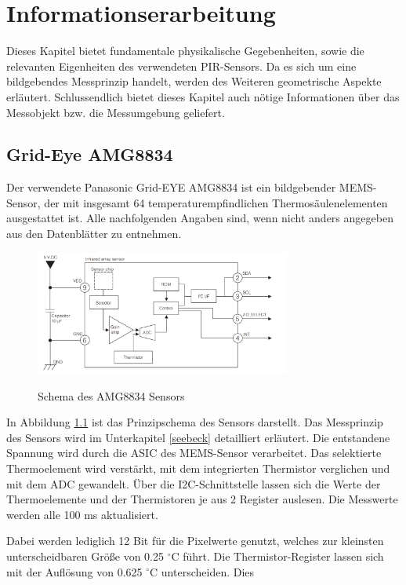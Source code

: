\chapter{Informationserarbeitung}
\label{chap:Informationsbeschaffung}
Dieses Kapitel bietet fundamentale physikalische Gegebenheiten, sowie die relevanten Eigenheiten des verwendeten \ac{PIR}-Sensors. Da es sich um eine bildgebendes Messprinzip handelt, werden des Weiteren geometrische Aspekte erläutert. Schlussendlich bietet dieses Kapitel auch nötige Informationen über das Messobjekt bzw. die Messumgebung geliefert.

\section{Grid-Eye AMG8834}

Der verwendete Panasonic Grid-EYE AMG8834 ist ein bildgebender \ac{MEMS}-Sensor, der mit insgesamt 64 temperaturempfindlichen Thermosäulenelementen ausgestattet ist. Alle nachfolgenden Angaben sind, wenn nicht anders angegeben aus den Datenblätter zu entnehmen.

\begin{figure}[H]
	\centering
	\includegraphics[width=0.75\textwidth]
	{fig/Circuit_AMG8834.PNG}
	\caption[Schema des AMG8834 Sensors]{Schema des AMG8834 Sensors} \protect\cite{AMG8834}
	\label{fig:SchemaAMG8834}
\end{figure}


In Abbildung \ref{fig:SchemaAMG8834} ist das Prinzipschema des Sensors darstellt. Das Messprinzip des Sensors wird im Unterkapitel \ref{seebeck} detailliert erläutert. Die entstandene Spannung wird durch die \ac{ASIC} des \ac{MEMS}-Sensor verarbeitet. Das selektierte Thermoelement wird verstärkt, mit dem integrierten Thermistor verglichen und mit dem \ac{ADC} gewandelt. Über die \ac{I2C}-Schnittstelle lassen sich die Werte der Thermoelemente und der Thermistoren je aus 2 Register auslesen. Die Messwerte werden alle 100 ms aktualisiert. 
 
Dabei werden lediglich 12 Bit für die Pixelwerte genutzt, welches zur kleinsten unterscheidbaren Größe von 0.25 $^\circ$C führt. Die Thermistor-Register lassen sich mit der Auflösung von 0.625 $^\circ$C unterscheiden. Dies

